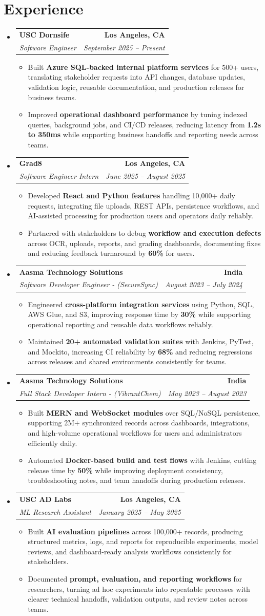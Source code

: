 \documentclass[letterpaper,10pt]{article}
\makeatletter
\newcommand{\resumeItem}[1]{\item\small{{#1 \vspace{-2pt}}}}
\newcommand{\resumeSubheading}[4]{\vspace{-1pt}\item\begin{tabular*}{1.0\textwidth}[t]{l@{\extracolsep{\fill}}r}\textbf{#1} & \textbf{\small #2} \\\textit{\small#3} & \textit{\small #4} \\\end{tabular*}\vspace{-2pt}}
\newcommand{\resumeSubHeadingListStart}{\begin{itemize}[leftmargin=0.0in, label={}]}
\newcommand{\resumeSubHeadingListEnd}{\end{itemize}}
\newcommand{\resumeItemListStart}{\begin{itemize}[leftmargin=0.15in,label=\textbullet,itemsep=2pt,topsep=0pt,parsep=0pt,partopsep=0pt]}
\newcommand{\resumeItemListEnd}{\end{itemize}\vspace{-4pt}}
\makeatother
\begin{document}
\section{Experience}
\resumeSubHeadingListStart
\resumeSubheading{USC Dornsife}{Los Angeles, CA}{Software Engineer}{September 2025 -- Present}
\resumeItemListStart
\resumeItem{Built \textbf{Azure SQL-backed internal platform services} for 500+ users, translating stakeholder requests into API changes, database updates, validation logic, reusable documentation, and production releases for business teams.}
\resumeItem{Improved \textbf{operational dashboard performance} by tuning indexed queries, background jobs, and CI/CD releases, reducing latency from \textbf{1.2s to 350ms} while supporting business handoffs and reporting needs across teams.}
\resumeItemListEnd
\resumeSubheading{Grad8}{Los Angeles, CA}{Software Engineer Intern}{June 2025 -- August 2025}
\resumeItemListStart
\resumeItem{Developed \textbf{React and Python features} handling 10,000+ daily requests, integrating file uploads, REST APIs, persistence workflows, and AI-assisted processing for production users and operators daily reliably.}
\resumeItem{Partnered with stakeholders to debug \textbf{workflow and execution defects} across OCR, uploads, reports, and grading dashboards, documenting fixes and reducing feedback turnaround by \textbf{60\%} for users.}
\resumeItemListEnd
\resumeSubheading{Aasma Technology Solutions}{India}{Software Developer Engineer - (SecureSync)}{August 2023 -- July 2024}
\resumeItemListStart
\resumeItem{Engineered \textbf{cross-platform integration services} using Python, SQL, AWS Glue, and S3, improving response time by \textbf{30\%} while supporting operational reporting and reusable data workflows reliably.}
\resumeItem{Maintained \textbf{20+ automated validation suites} with Jenkins, PyTest, and Mockito, increasing CI reliability by \textbf{68\%} and reducing regressions across releases and shared environments consistently for teams.}
\resumeItemListEnd
\resumeSubheading{Aasma Technology Solutions}{India}{Full Stack Developer Intern - (VibrantChem)}{May 2023 -- August 2023}
\resumeItemListStart
\resumeItem{Built \textbf{MERN and WebSocket modules} over SQL/NoSQL persistence, supporting 2M+ synchronized records across dashboards, integrations, and high-volume operational workflows for users and administrators efficiently daily.}
\resumeItem{Automated \textbf{Docker-based build and test flows} with Jenkins, cutting release time by \textbf{50\%} while improving deployment consistency, troubleshooting notes, and team handoffs during production releases.}
\resumeItemListEnd
\resumeSubheading{USC AD Labs}{Los Angeles, CA}{ML Research Assistant}{January 2025 -- May 2025}
\resumeItemListStart
\resumeItem{Built \textbf{AI evaluation pipelines} across 100,000+ records, producing structured metrics, logs, and reports for reproducible experiments, model reviews, and dashboard-ready analysis workflows consistently for stakeholders.}
\resumeItem{Documented \textbf{prompt, evaluation, and reporting workflows} for researchers, turning ad hoc experiments into repeatable processes with clearer technical handoffs, validation outputs, and review notes across teams.}
\resumeItemListEnd
\resumeSubHeadingListEnd
\vspace{-6pt}
\end{document}

